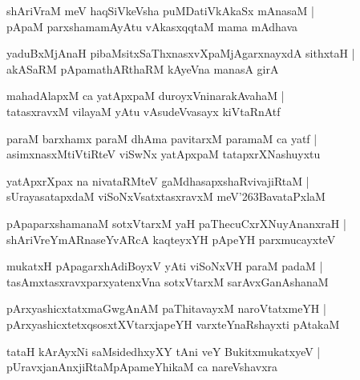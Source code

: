 \documentclass[twoside,12pt,openright]{book}
\def\S{\char'263}
\newcounter{shloka}[chapter]
\begin{document}
\begin{shloka}%
shAriVraM meV haqSiVkeVsha puMDatiVkAkaSx mAnasaM |\\
pApaM parxshamamAyAtu vAkasxqqtaM mama mAdhava 
\end{shloka}

\begin{shloka}%
yaduBxMjAnaH pibaMsitxSaThxnasxvXpaMjAgarxnayxdA sithxtaH |\\
akASaRM pApamathARthaRM kAyeVna manasA girA
\end{shloka}

\begin{shloka}%
mahadAlapxM ca yatApxpaM duroyxVninarakAvahaM |\\
tatasxravxM vilayaM yAtu vAsudeVvasayx kiVtaRnAtf
\end{shloka}

\begin{shloka}%
paraM barxhamx paraM dhAma pavitarxM paramaM ca yatf |\\
asimxnasxMtiVtiRteV viSwNx yatApxpaM tatapxrXNashuyxtu
\end{shloka}

\begin{shloka}%
yatApxrXpax na nivataRMteV gaMdhasapxshaRvivajiRtaM |\\
sUrayasatapxdaM viSoNxVsatxtasxravxM meV\S BavataPxlaM
\end{shloka}

\begin{shloka}%
pApaparxshamanaM sotxVtarxM yaH paThecuCxrXNuyAnanxraH |\\
shAriVreYmARnaseYvARcA kaqteyxYH pApeYH parxmucayxteV 
\end{shloka}

\begin{shloka}%
mukatxH pApagarxhAdiBoyxV yAti viSoNxVH paraM padaM |\\
tasAmxtasxravxparxyatenxVna sotxVtarxM sarAvxGanAshanaM 
\end{shloka}

\begin{shloka}%
pArxyashicxtatxmaGwgAnAM paThitavayxM naroVtatxmeYH |\\
pArxyashicxtetxqsosxtXVtarxjapeYH varxteYnaRshayxti pAtakaM 
\end{shloka}

\begin{shloka}%
tataH kArAyxNi saMsidedhxyXY tAni veY BukitxmukatxyeV |\\
pUravxjanAnxjiRtaMpApameYhikaM ca nareVshavxra
\end{shloka}
\end{document}
